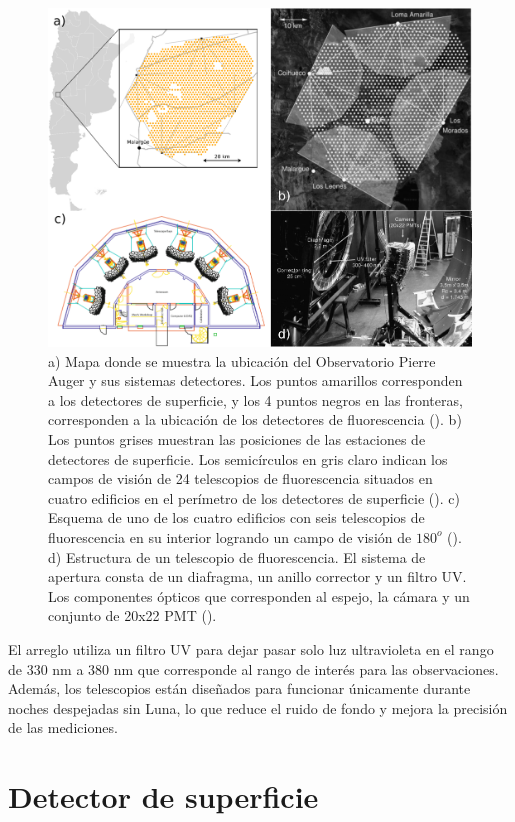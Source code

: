 \begin{figure}[!ht]
\centering
\includegraphics[width=1\textwidth]{Figs/FD_auger_composition.png}
\caption{a) Mapa donde se muestra la ubicación del Observatorio Pierre Auger y sus sistemas detectores. Los puntos amarillos corresponden a los detectores de superficie, y los 4 puntos negros en las fronteras, corresponden a la ubicación de los detectores de fluorescencia (\cite{asorey_2012}). b) Los puntos grises muestran las posiciones de las estaciones de detectores de superficie. Los semicírculos en gris claro indican los campos de visión de 24 telescopios de fluorescencia situados en cuatro edificios en el perímetro de los detectores de superficie (\cite{FD_auger}). c) Esquema de uno de los cuatro edificios con seis telescopios de fluorescencia en su interior logrando un campo de visión de $180^{o}$ (\cite{FD_auger}). d) Estructura de un telescopio de fluorescencia. El sistema de apertura consta de un diafragma, un anillo corrector y un filtro UV. Los componentes ópticos que corresponden al espejo, la cámara y un conjunto de 20x22 PMT (\cite{dedonato_2007}).}
\label{fd_auger}
\end{figure}

El arreglo utiliza un filtro UV para dejar pasar solo luz ultravioleta en el rango de 330 nm a 380 nm que corresponde al rango de interés para las observaciones. Además, los telescopios están diseñados para funcionar únicamente durante noches despejadas sin Luna, lo que reduce el ruido de fondo y mejora la precisión de las mediciones. 

\section{Detector de superficie}

